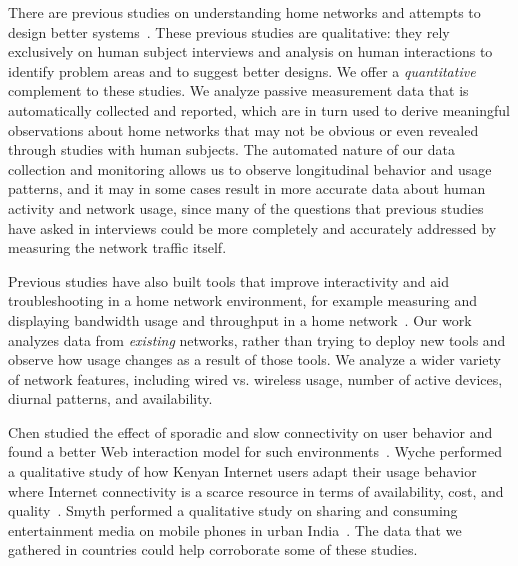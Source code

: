   There are
previous studies on understanding home networks and attempts to design
better
systems~\cite{grinter2005work,grinter2009ins,keith2011advancing,Chetty:2007:SHL,poole2008more,calvert2007moving}.
These previous studies are qualitative: they rely exclusively on human
subject interviews and analysis on human interactions to identify
problem areas and to suggest better designs.  We offer a {\em
  quantitative} complement to these studies. We analyze passive
measurement data that is automatically collected and reported, which are
in turn used to derive meaningful observations about home networks that
may not be obvious or even revealed through studies with human
subjects.  The automated nature of our data collection and monitoring
allows us to observe longitudinal behavior and usage patterns, and it may
in some cases result in more accurate data about human activity and
network usage, since many of the questions that previous studies have
asked in interviews could be more completely and accurately addressed by
measuring the network traffic itself.

Previous studies have also built tools that improve interactivity and
aid troubleshooting in a home network environment, for example
measuring and displaying bandwidth usage and throughput in a home
network~\cite{Chetty-2010,Chetty:2011:WMI}.  Our work analyzes data from
{\em existing} networks, rather than trying to deploy new tools and
observe how usage changes as a result of those tools.  We analyze a
wider variety of network features, including wired vs. wireless usage,
number of active devices, diurnal patterns, and availability.

Chen \ea studied the effect of sporadic and slow connectivity on user
behavior and found a better Web interaction model for such
environments~\cite{Chen:2010:CWI}. Wyche \ea performed a qualitative
study of how Kenyan Internet users adapt their usage behavior where
Internet connectivity is a scarce resource in terms of availability,
cost, and quality~\cite{Wyche:2010:DIC}.  Smyth \ea performed a
qualitative study on sharing and consuming entertainment media on mobile
phones in urban India~\cite{Smyth:2010:TTW}.  The data that we
gathered in \developing{} countries could help
corroborate some of these studies.




